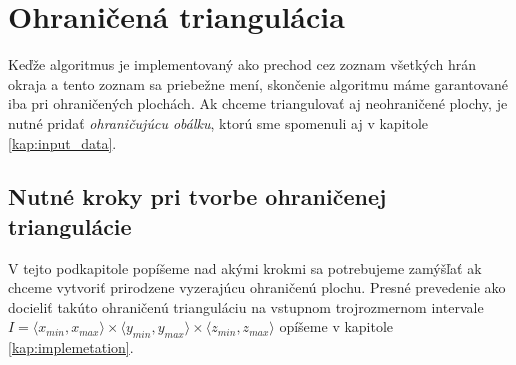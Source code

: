 \section{Ohraničená triangulácia}
\label{kap:bounded_triangulation}
Keďže algoritmus je implementovaný ako prechod cez zoznam všetkých hrán okraja a tento zoznam 
sa priebežne mení, skončenie algoritmu máme garantované iba pri ohraničených plochách.
Ak chceme triangulovať aj neohraničené plochy, je nutné pridať \textit{ohraničujúcu obálku}, 
ktorú sme spomenuli aj v kapitole \ref{kap:input_data}.

\subsection{Nutné kroky pri tvorbe ohraničenej triangulácie}

V tejto podkapitole popíšeme nad akými krokmi sa potrebujeme zamýšľať ak chceme vytvoriť prirodzene 
vyzerajúcu ohraničenú plochu. Presné prevedenie
ako docieliť takúto ohraničenú trianguláciu na vstupnom trojrozmernom intervale 
$I = \langle x_{min}, x_{max} \rangle \times \langle y_{min}, y_{max} \rangle \times 
\langle z_{min}, z_{max} \rangle$ opíšeme v kapitole \ref{kap:implemetation}.

